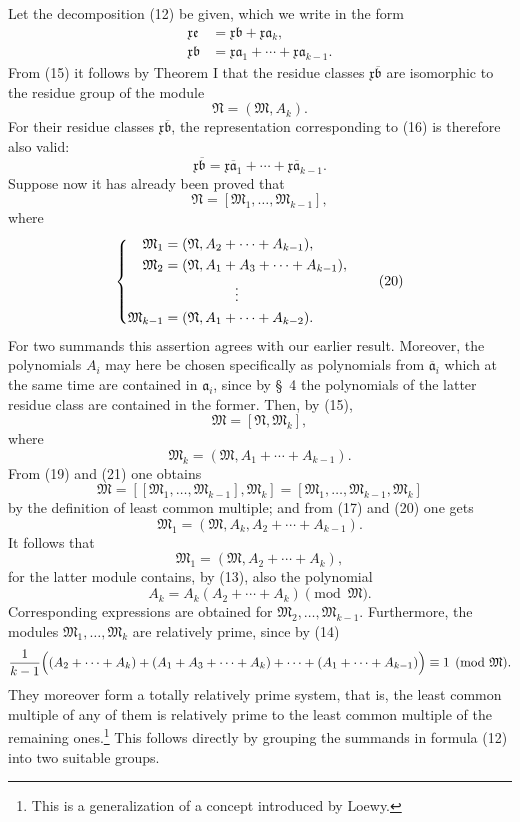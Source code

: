 \documentclass[11pt]{article}
\newcommand{\mM}{\mathfrak{M}}
\newcommand{\mN}{\mathfrak{N}}
\newcommand{\ma}{\mathfrak{a}}
\newcommand{\mb}{\mathfrak{b}}
\newcommand{\mx}{\mathfrak{x}}
\newcommand{\me}{\mathfrak{e}}
\begin{document}
Let the decomposition (12) be given, which we write in the form
\begin{align}
 \mx\me&=\mx\mb+\mx\ma_k,\tag{15}\\
 \mx\mb&=\mx\ma_1+\cdots+\mx\ma_{k-1}.\tag{16}
\end{align}
From (15) it follows by Theorem I that the residue classes $\mx\overline{\mb}$ are isomorphic to the residue group of the module
\begin{equation}
 \mN=(\mM,A_k).
\tag{17}
\end{equation}
For their residue classes $\mx\overline{\mb}$, the representation corresponding to (16) is therefore also valid:
\begin{equation}
 \mx\overline{\mb}=\mx\overline{\ma}_1+\cdots+\mx\overline{\ma}_{k-1}.
\tag{18}
\end{equation}
Suppose now it has already been proved that
\begin{equation}
 \mN=[\mM_1,\ldots,\mM_{k-1}],
\tag{19}
\end{equation}
where
\begin{equation}
\left\{
\begin{aligned}
 \mM_1&=(\mN,A_2+\cdots+A_{k-1}),\\
 \mM_2&=(\mN,A_1+A_3+\cdots+A_{k-1}),\\
 &\hspace{1.8cm}\vdots\\
 \mM_{k-1}&=(\mN,A_1+\cdots+A_{k-2}).
\end{aligned}\right.
\tag{20}
\end{equation}
For two summands this assertion agrees with our earlier result. Moreover, the polynomials $A_i$ may here be chosen specifically as polynomials from $\overline{\ma}_i$ which at the same time are contained in $\ma_i$, since by \S~4 the polynomials of the latter residue class are contained in the former. Then, by (15),
\begin{equation}
 \mM=[\mN,\mM_k],
\tag{21}
\end{equation}
where
\[
 \mM_k=(\mM,A_1+\cdots+A_{k-1}).
\]
From (19) and (21) one obtains
\[
 \mM=[[\mM_1,
 \ldots,\mM_{k-1}],\mM_k]=[\mM_1,\ldots,\mM_{k-1},\mM_k]
\]
by the definition of least common multiple; and from (17) and (20) one gets
\[
 \mM_1=(\mM,A_k,A_2+\cdots+A_{k-1}).
\]
It follows that
\[
 \mM_1=(\mM,A_2+\cdots+A_k),
\]
for the latter module contains, by (13), also the polynomial
\[
 A_k=A_k(A_2+\cdots+A_k)\pmod{\mM}.
\]
Corresponding expressions are obtained for $\mM_2,\ldots,\mM_{k-1}$. Furthermore, the modules $\mM_1,\ldots,\mM_k$ are relatively prime, since by (14)
\[
 \frac{1}{k-1}\Bigl((A_2+\cdots+A_k)+(A_1+A_3+\cdots+A_k)+\cdots+(A_1+\cdots+A_{k-1})\Bigr)\equiv1\pmod{\mM}.
\]
They moreover form a totally relatively prime system, that is, the least common multiple of any of them is relatively prime to the least common multiple of the remaining ones.\footnote{This is a generalization of a concept introduced by Loewy.} This follows directly by grouping the summands in formula (12) into two suitable groups.
\end{document}
